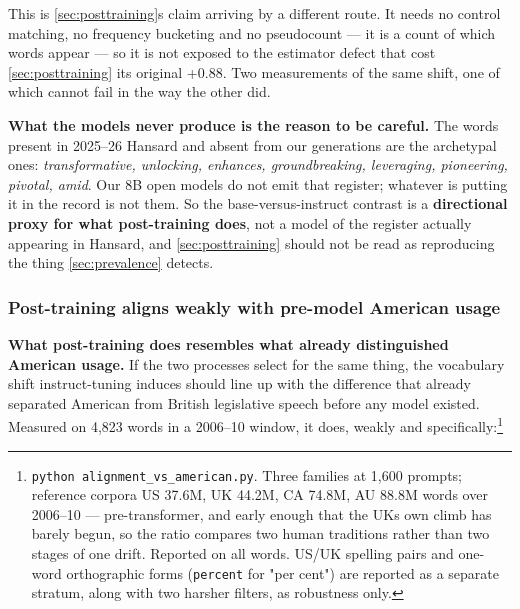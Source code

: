 This is \cref{sec:posttraining}\textquotesingle s claim arriving by a different route. It needs no control
matching, no frequency bucketing and no pseudocount --- it is a count of which
words appear --- so it is not exposed to the estimator defect that cost \cref{sec:posttraining} its
original +0.88. Two measurements of the same shift, one of which cannot fail in
the way the other did.

\textbf{What the models never produce is the reason to be careful.} The words
present in 2025--26 Hansard and absent from our generations are the archetypal
ones: \emph{transformative, unlocking, enhances, groundbreaking, leveraging,
pioneering, pivotal, amid}. Our 8B open models do not emit that register;
whatever is putting it in the record is not them. So the base-versus-instruct
contrast is a \textbf{directional proxy for what post-training does}, not a model of
the register actually appearing in Hansard, and \cref{sec:posttraining} should not be read as
reproducing the thing \cref{sec:prevalence} detects.

\subsubsection{Post-training aligns weakly with pre-model American usage}\label{sec:american-alignment}

\textbf{What post-training does resembles what already distinguished American
usage.} If the two processes select for the same thing, the vocabulary shift
instruct-tuning induces should line up with the difference that already
separated American from British legislative speech before any model existed.
Measured on 4,823 words in a 2006--10 window, it does, weakly and
specifically:\footnote{\texttt{python\ alignment\_\allowbreak{}vs\_\allowbreak{}american.\allowbreak{}py}. Three families at 1,600 prompts;
  reference corpora US 37.6M, UK 44.2M, CA 74.8M, AU 88.8M words over
  2006--10 --- pre-transformer, and early enough that the UK\textquotesingle s own climb has
  barely begun, so the ratio compares two human traditions rather than two
  stages of one drift. Reported on all words. US/UK spelling pairs and
  one-word orthographic forms (\texttt{percent} for "per cent") are reported as a
  separate stratum, along with two harsher filters, as robustness only.}

